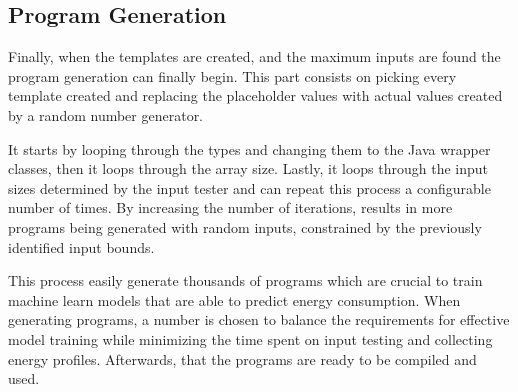 \subsection{Program Generation} \label{sec:work_stage1_program_generation}

Finally, when the templates are created, and the maximum inputs are found the program generation can finally begin. This part consists on picking every template created and replacing the placeholder values with actual values created by a random number generator.

It starts by looping through the types and changing them to the Java wrapper classes, then it loops through the array size. Lastly, it loops through the input sizes determined by the input tester and can repeat this process a configurable number of times. By increasing the number of iterations, results in more programs being generated with random inputs, constrained by the previously identified input bounds. 

This process easily generate thousands of programs which are crucial to train machine learn models that are able to predict energy consumption. When generating programs, a number is chosen to balance the requirements for effective model training while minimizing the time spent on input testing and collecting energy profiles. Afterwards, that the programs are ready to be compiled and used.